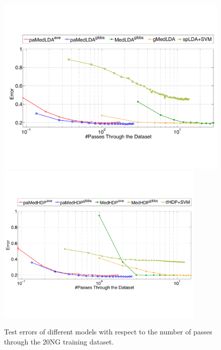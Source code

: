 \documentclass[twoside,11pt]{article}
\begin{document}
\begin{figure}[t]
\begin{center}
\includegraphics[width = .9\textwidth]{plot_multic_commit_lda_jmlr.pdf}
\includegraphics[width = 0.89\textwidth]{plot_multic_commit_hdp_jmlr.pdf}
\end{center}\vspace*{-0.2cm}
\caption{Test errors of different models with respect to the number of passes through the 20NG training dataset. }
\vspace*{-0.2cm}
\label{fg:multic_commit}
\end{figure}
\end{document}
